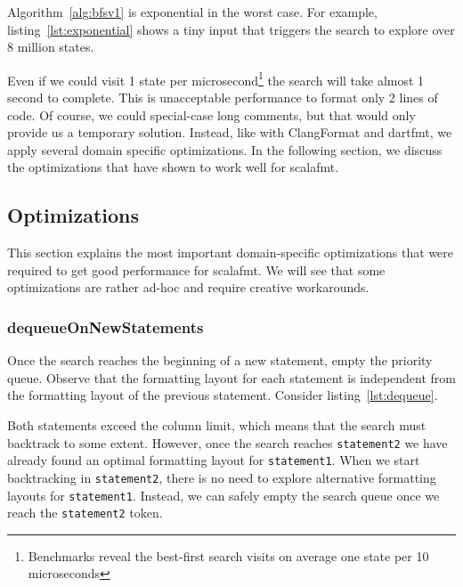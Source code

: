 Algorithm~\ref{alg:bfsv1} is exponential in the worst case.
For example, listing~\ref{lst:exponential} shows a tiny input that triggers the search to explore over 8 million states.
\begin{minipage}{\linewidth}
  
\end{minipage}
Even if we could visit 1 state per microsecond\footnote{
  Benchmarks reveal the best-first search visits on average one state per 10 microseconds
} the search will take almost 1 second to complete.
This is unacceptable performance to format only 2 lines of code.
Of course, we could special-case long comments, but that would only provide us a temporary solution.
Instead, like with ClangFormat and dartfmt, we apply several domain specific optimizations.
In the following section, we discuss the optimizations that have shown to work well for scalafmt.

\subsection{Optimizations}\label{sec:optimizations}
This section explains the most important domain-specific optimizations that were required to get good performance for scalafmt.
We will see that some optimizations are rather ad-hoc and require creative workarounds.

\subsubsection{dequeueOnNewStatements}\label{sec:dequeue}
Once the search reaches the beginning of a new statement, empty the priority queue.
Observe that the formatting layout for each statement is independent from the formatting layout of the previous statement.
Consider listing~\ref{lst:dequeue}.

Both statements exceed the column limit, which means that the search must backtrack to some extent.
However, once the search reaches \texttt{statement2} we have already found an optimal formatting layout for \texttt{statement1}.
When we start backtracking in \texttt{statement2}, there is no need to explore alternative formatting layouts for \texttt{statement1}.
Instead, we can safely empty the search queue once we reach the \texttt{statement2} token.

